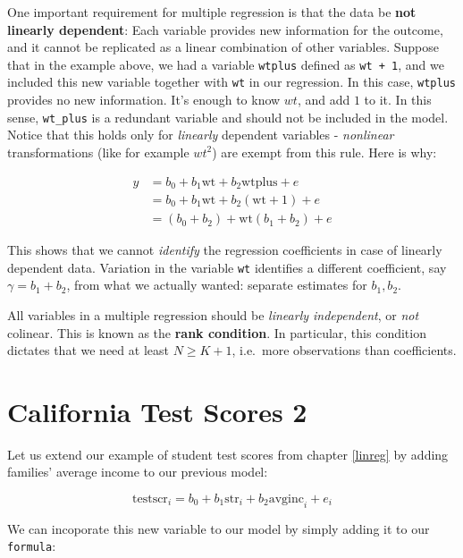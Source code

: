 \documentclass[]{book}
\newenvironment{note}{\begin{tcolorbox}[colback=blue!5!white,colframe=blue!75!black,title=\textbf{Note:}]}{\end{tcolorbox}}
\theoremstyle{definition}
\theoremstyle{definition}
\theoremstyle{definition}
\theoremstyle{remark}
\begin{document}
One important requirement for multiple regression is that the data be
\textbf{not linearly dependent}: Each variable provides new information
for the outcome, and it cannot be replicated as a linear combination of
other variables. Suppose that in the example above, we had a variable
\texttt{wtplus} defined as \texttt{wt\ +\ 1}, and we included this new
variable together with \texttt{wt} in our regression. In this case,
\texttt{wtplus} provides no new information. It's enough to know \(wt\),
and add \(1\) to it. In this sense, \texttt{wt\_plus} is a redundant
variable and should not be included in the model. Notice that this holds
only for \emph{linearly} dependent variables - \emph{nonlinear}
transformations (like for example \(wt^2\)) are exempt from this rule.
Here is why:

\begin{align}
y &= b_0 + b_1 \text{wt} + b_2 \text{wtplus} + e \\
  &= b_0 + b_1 \text{wt} + b_2 (\text{wt} + 1) + e \\
  &= (b_0 + b_2) + \text{wt} (b_1 + b_2) + e
\end{align}

This shows that we cannot \emph{identify} the regression coefficients in
case of linearly dependent data. Variation in the variable \texttt{wt}
identifies a different coefficient, say \(\gamma = b_1 + b_2\), from
what we actually wanted: separate estimates for \(b_1,b_2\).

\begin{note}
All variables in a multiple regression should be \emph{linearly
independent}, or \emph{not} colinear. This is known as the \textbf{rank
condition}. In particular, this condition dictates that we need at least
\(N \geq K+1\), i.e.~more observations than coefficients.
\end{note}

\section{California Test Scores 2}\label{california-test-scores-2}

Let us extend our example of student test scores from chapter
\ref{linreg} by adding families' average income to our previous model:

\[
\text{testscr}_i = b_0 + b_1  \text{str}_i + b_2  \text{avginc}_i + e_i
\]

We can incoporate this new variable to our model by simply adding it to
our \texttt{formula}:
\end{document}
